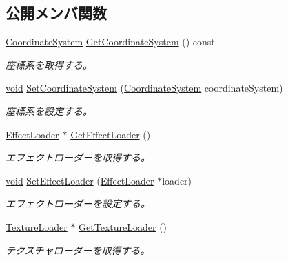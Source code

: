\subsection*{公開メンバ関数}
\begin{DoxyCompactItemize}
\item 
\mbox{\hyperlink{namespace_effekseer_ac8508f8823c5fcf36aac5d2ddee23765}{Coordinate\+System}} \mbox{\hyperlink{class_effekseer_1_1_setting_a71581209c5c2cd215b08bdf364228278}{Get\+Coordinate\+System}} () const
\begin{DoxyCompactList}\small\item\em 座標系を取得する。 \end{DoxyCompactList}\item 
\mbox{\hyperlink{namespace_effekseer_ab34c4088e512200cf4c2716f168deb56}{void}} \mbox{\hyperlink{class_effekseer_1_1_setting_ab252bfe6bd18b3fafafae0e37351df72}{Set\+Coordinate\+System}} (\mbox{\hyperlink{namespace_effekseer_ac8508f8823c5fcf36aac5d2ddee23765}{Coordinate\+System}} coordinate\+System)
\begin{DoxyCompactList}\small\item\em 座標系を設定する。 \end{DoxyCompactList}\item 
\mbox{\hyperlink{class_effekseer_1_1_effect_loader}{Effect\+Loader}} $\ast$ \mbox{\hyperlink{class_effekseer_1_1_setting_acc942d6e37a65418d1dd2d873fcb257d}{Get\+Effect\+Loader}} ()
\begin{DoxyCompactList}\small\item\em エフェクトローダーを取得する。 \end{DoxyCompactList}\item 
\mbox{\hyperlink{namespace_effekseer_ab34c4088e512200cf4c2716f168deb56}{void}} \mbox{\hyperlink{class_effekseer_1_1_setting_acc38b8b4013c440242f1bba9a9696639}{Set\+Effect\+Loader}} (\mbox{\hyperlink{class_effekseer_1_1_effect_loader}{Effect\+Loader}} $\ast$loader)
\begin{DoxyCompactList}\small\item\em エフェクトローダーを設定する。 \end{DoxyCompactList}\item 
\mbox{\hyperlink{class_effekseer_1_1_texture_loader}{Texture\+Loader}} $\ast$ \mbox{\hyperlink{class_effekseer_1_1_setting_a9f82bd40e38723511b10aaaf780b2095}{Get\+Texture\+Loader}} ()
\begin{DoxyCompactList}\small\item\em テクスチャローダーを取得する。 \end{DoxyCompactList}\item 

\end{DoxyCompactItemize}
